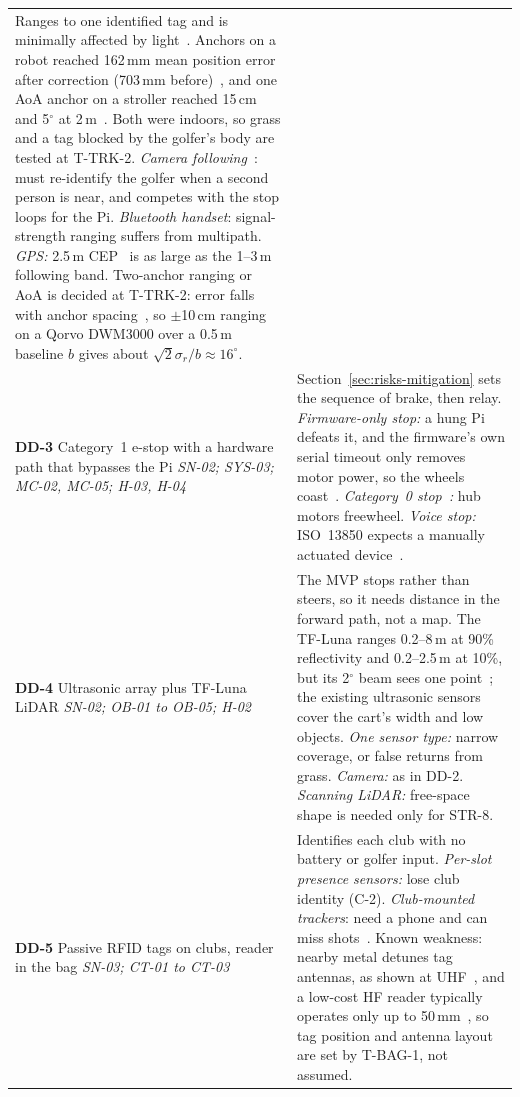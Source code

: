 \begin{table}[H]
\begin{tabularx}{\linewidth}{@{}L{1.62in} Y@{}}
Ranges to one identified tag and is minimally affected by light~\cite{zhang2024stroller}. Anchors on a robot reached 162\,mm mean position error after correction (703\,mm before)~\cite{bae2022uwb}, and one \acs{AoA} anchor on a stroller reached 15\,cm and 5$^\circ$ at 2\,m~\cite{zhang2024stroller}. Both were indoors, so grass and a tag blocked by the golfer's body are tested at \mbox{T-TRK-2}. \emph{Camera following}~\cite{islam2019personFollowing}: must re-identify the golfer when a second person is near, and competes with the stop loops for the Pi. \emph{Bluetooth handset}: signal-strength ranging suffers from multipath. \emph{\acs{GPS}:} 2.5\,m \acs{CEP}~\cite{neom8ds} is as large as the 1--3\,m following band. Two-anchor ranging or \acs{AoA} is decided at \mbox{T-TRK-2}: error falls with anchor spacing~\cite{bae2022uwb}, so $\pm$10\,cm ranging on a Qorvo DWM3000 over a 0.5\,m baseline $b$ gives about $\sqrt{2}\sigma_r/b \approx 16^\circ$. \\
\addlinespace[3pt]
\textbf{DD-3} Category~1 e-stop with a hardware path that bypasses the Pi \newline \emph{\mbox{SN-02}; \mbox{SYS-03}; \mbox{MC-02}, \mbox{MC-05}; \mbox{H-03}, \mbox{H-04}} &
Section~\ref{sec:risks-mitigation} sets the sequence of brake, then relay. \emph{Firmware-only stop:} a hung Pi defeats it, and the firmware's own serial timeout only removes motor power, so the wheels coast~\cite{feruFoc}. \emph{Category~0 stop~\cite{iec60204-1}:} hub motors freewheel. \emph{Voice stop:} ISO~13850 expects a manually actuated device~\cite{iso13850}. \\
\addlinespace[3pt]
\textbf{DD-4} Ultrasonic array plus TF-Luna \acs{LiDAR} \newline \emph{\mbox{SN-02}; \mbox{OB-01} to \mbox{OB-05}; \mbox{H-02}} &
The \acs{MVP} stops rather than steers, so it needs distance in the forward path, not a map. The TF-Luna ranges 0.2--8\,m at 90\% reflectivity and 0.2--2.5\,m at 10\%, but its 2$^\circ$ beam sees one point~\cite{tflunads}; the existing ultrasonic sensors cover the cart's width and low objects. \emph{One sensor type:} narrow coverage, or false returns from grass. \emph{Camera:} as in DD-2. \emph{Scanning \acs{LiDAR}:} free-space shape is needed only for STR-8. \\
\addlinespace[3pt]
\textbf{DD-5} Passive \acs{RFID} tags on clubs, reader in the bag \newline \emph{\mbox{SN-03}; \mbox{CT-01} to \mbox{CT-03}} &
Identifies each club with no battery or golfer input. \emph{Per-slot presence sensors:} lose club identity (C-2). \emph{Club-mounted trackers}: need a phone and can miss shots~\cite{hall2025golfGps}. Known weakness: nearby metal detunes tag antennas, as shown at \acs{UHF}~\cite{dobkin2005rfid}, and a low-cost \acs{HF} reader typically operates only up to 50\,mm~\cite{mfrc522ds}, so tag position and antenna layout are set by \mbox{T-BAG-1}, not assumed. \\

\end{tabularx}
\end{table}
